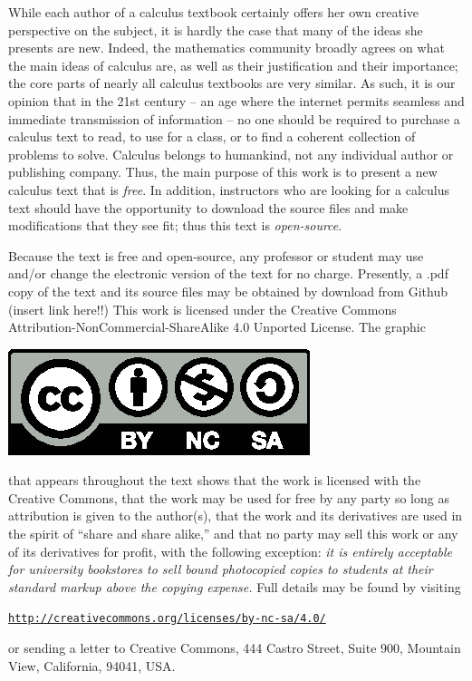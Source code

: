While each author of a calculus textbook certainly offers her own creative perspective on the subject, it is hardly the case that many of the ideas she presents are new.  Indeed, the mathematics community broadly agrees on what the main ideas of calculus are, as well as their justification and their importance; the core parts of nearly all calculus textbooks are very similar.  As such, it is our opinion that in the 21st century -- an age where the internet permits seamless and immediate transmission of information -- no one should be required to purchase a calculus text to read, to use for a class, or to find a coherent collection of problems to solve.  Calculus belongs to humankind, not any individual author or publishing company.  Thus, the main purpose of this work is to present a new calculus text that is \emph{free}.  In addition, instructors who are looking for a calculus text should have the opportunity to download the source files and make modifications that they see fit; thus this text is \emph{open-source}.  

Because the text is free and open-source, any professor or student may use and/or change the electronic version of the text for no charge.  Presently, a .pdf copy of the text and its source files may be obtained by download from Github (insert link here!!)
This work is licensed under the Creative Commons Attribution-NonCommercial-ShareAlike 4.0 Unported License.  The graphic 
\begin{center}
\includegraphics{figures/CClicense.eps}
\end{center}
that appears throughout the text shows that the work is licensed with the Creative Commons, that the work may be used for free by any party so long as attribution is given to the author(s), that the work and its derivatives are used in the spirit of ``share and share alike,'' and that no party may sell this work or any of its derivatives for profit, with the following exception:  \emph{it is entirely acceptable for university bookstores to sell bound photocopied copies to students at their standard markup above the copying expense.}  Full details may be found by visiting
\begin{center}
\href{http://creativecommons.org/licenses/by-nc-sa/4.0/}{\texttt{http://creativecommons.org/licenses/by-nc-sa/4.0/}}
\end{center} 
or sending a letter to Creative Commons, 444 Castro Street, Suite 900, Mountain View, California, 94041, USA. 

